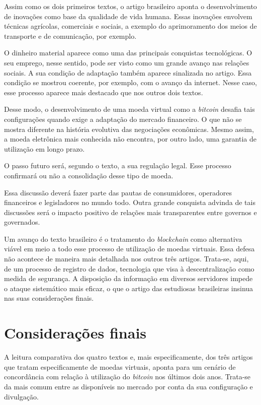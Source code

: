 \documentclass[12pt]{article}
\begin{document}
Assim como os dois primeiros textos, o artigo brasileiro aponta o desenvolvimento de inovações como base da qualidade de vida humana. Essas inovações envolvem técnicas agrícolas, comerciais e sociais, a exemplo do aprimoramento dos meios de transporte e de comunicação, por exemplo.

O dinheiro material aparece como uma das principais conquistas tecnológicas. O seu emprego, nesse sentido, pode ser visto como um grande avanço nas relações sociais. A sua condição de adaptação também aparece sinalizada no artigo. Essa condição se mostrou coerente, por exemplo, com o avanço da internet. Nesse caso, esse processo aparece mais destacado que nos outros dois textos.

Desse modo, o desenvolvimento de uma moeda virtual como a \textit{bitcoin} desafia tais configurações quando exige a adaptação do mercado financeiro. O que não se mostra diferente na história evolutiva das negociações econômicas. Mesmo assim, a moeda eletrônica mais conhecida não encontra, por outro lado, uma garantia de utilização em longo prazo. 

O passo futuro será, segundo o texto, a sua regulação legal. Esse processo confirmará ou não a consolidação desse tipo de moeda.

Essa discussão deverá fazer parte das pautas de consumidores, operadores financeiros e legisladores no mundo todo. Outra grande conquista advinda de tais discussões será o impacto positivo de relações mais transparentes entre governos e governados.

Um avanço do texto brasileiro é o tratamento do \textit{blockchain} como alternativa viável em meio a todo esse processo de utilização de moedas virtuais. Essa defesa não acontece de maneira mais detalhada nos outros três artigos. Trata-se, aqui, de um processo de registro de dados, tecnologia que visa à descentralização como medida de segurança. A disposição da informação em diversos servidores impede o ataque sistemático mais eficaz, o que o artigo das estudiosas brasileiras insinua nas suas considerações finais.


\section{Considerações finais}

A leitura comparativa dos quatro textos e, mais especificamente, dos três artigos que tratam especificamente de moedas virtuais, aponta para um cenário de concordância com relação à utilização do \textit{bitcoin} nos últimos dois anos. Trata-se da mais comum entre as disponíveis no mercado por conta da sua configuração e divulgação.
\end{document}
